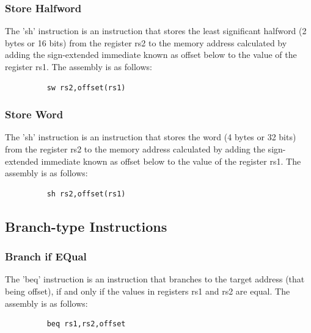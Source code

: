 \documentclass{article}
\begin{document}
\subsubsection{Store Halfword}
\qquad
The 'sh' instruction is an instruction that stores the least significant halfword (2 bytes or 16 bits) from the register rs2 to the memory address calculated by adding the sign-extended immediate known as offset below to the value of the register rs1. The assembly is as follows:
\begin{figure}[!htbp]
    \centering
    \begin{verbatim}
    sw rs2,offset(rs1)
    \end{verbatim}
\end{figure}\newline

\subsubsection{Store Word}
\qquad
The 'sh' instruction is an instruction that stores the word (4 bytes or 32 bits) from the register rs2 to the memory address calculated by adding the sign-extended immediate known as offset below to the value of the register rs1. The assembly is as follows:
\begin{figure}[!htbp]
    \centering
    \begin{verbatim}
    sh rs2,offset(rs1)
    \end{verbatim}
\end{figure}\newline


\subsection{Branch-type Instructions}

\subsubsection{Branch if EQual}
\qquad
The 'beq' instruction is an instruction that branches to the target address (that being offset), if and only if the values in registers rs1 and rs2 are equal. The assembly is as follows:
\begin{figure}[!htbp]
    \centering
    \begin{verbatim}
    beq rs1,rs2,offset
    \end{verbatim}
\end{figure}\newline
\end{document}
